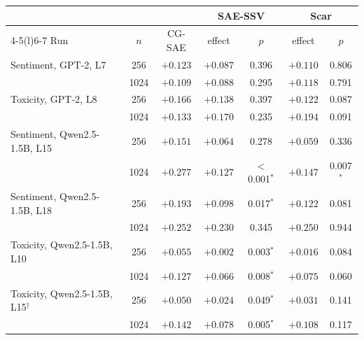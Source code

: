\begin{tabular}{@{}l c c cc cc@{}}
\toprule
 & & & \multicolumn{2}{c}{SAE-SSV} & \multicolumn{2}{c}{Scar} \\
\cmidrule(lr){4-5}\cmidrule(l){6-7}
Run & $n$ & CG-SAE & effect & $p$ & effect & $p$ \\
\midrule
Sentiment, GPT-2, L7 & 256 & $+0.123$ & $+0.087$ & 0.396 & $+0.110$ & 0.806 \\
 & 1024 & $+0.109$ & $+0.088$ & 0.295 & $+0.118$ & 0.791 \\
\addlinespace[2pt]
Toxicity, GPT-2, L8 & 256 & $+0.166$ & $+0.138$ & 0.397 & $+0.122$ & 0.087 \\
 & 1024 & $+0.133$ & $+0.170$ & 0.235 & $+0.194$ & 0.091 \\
\midrule
Sentiment, Qwen2.5-1.5B, L15 & 256 & $+0.151$ & $+0.064$ & 0.278 & $+0.059$ & 0.336 \\
 & 1024 & $+0.277$ & $+0.127$ & $<$0.001$^{*}$ & $+0.147$ & 0.007$^{*}$ \\
\addlinespace[2pt]
Sentiment, Qwen2.5-1.5B, L18 & 256 & $+0.193$ & $+0.098$ & 0.017$^{*}$ & $+0.122$ & 0.081 \\
 & 1024 & $+0.252$ & $+0.230$ & 0.345 & $+0.250$ & 0.944 \\
\addlinespace[2pt]
Toxicity, Qwen2.5-1.5B, L10 & 256 & $+0.055$ & $+0.002$ & 0.003$^{*}$ & $+0.016$ & 0.084 \\
 & 1024 & $+0.127$ & $+0.066$ & 0.008$^{*}$ & $+0.075$ & 0.060 \\
\addlinespace[2pt]
Toxicity, Qwen2.5-1.5B, L15$^{\dagger}$ & 256 & $+0.050$ & $+0.024$ & 0.049$^{*}$ & $+0.031$ & 0.141 \\
 & 1024 & $+0.142$ & $+0.078$ & 0.005$^{*}$ & $+0.108$ & 0.117 \\
\bottomrule
\end{tabular}